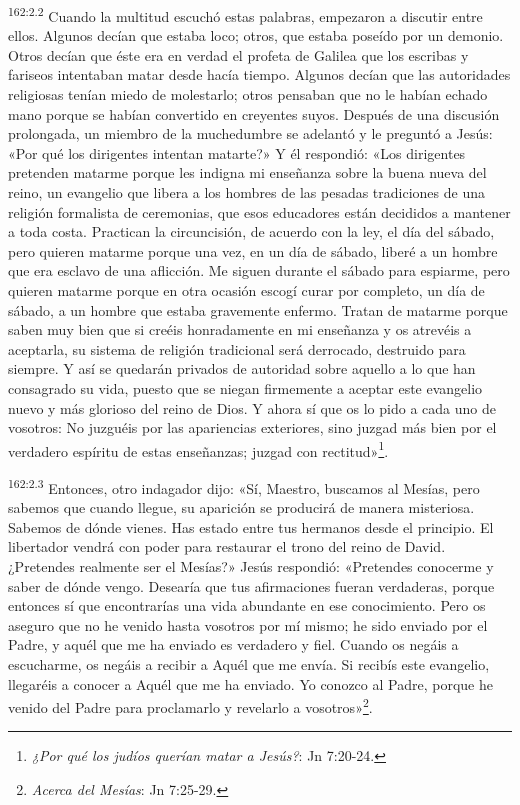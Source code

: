 \par 
\textsuperscript{162:2.2} Cuando la multitud escuchó estas palabras, empezaron a discutir entre ellos. Algunos decían que estaba loco; otros, que estaba poseído por un demonio. Otros decían que éste era en verdad el profeta de Galilea que los escribas y fariseos intentaban matar desde hacía tiempo. Algunos decían que las autoridades religiosas tenían miedo de molestarlo; otros pensaban que no le habían echado mano porque se habían convertido en creyentes suyos. Después de una discusión prolongada, un miembro de la muchedumbre se adelantó y le preguntó a Jesús: «Por qué los dirigentes intentan matarte?» Y él respondió: «Los dirigentes pretenden matarme porque les indigna mi enseñanza sobre la buena nueva del reino, un evangelio que libera a los hombres de las pesadas tradiciones de una religión formalista de ceremonias, que esos educadores están decididos a mantener a toda costa. Practican la circuncisión, de acuerdo con la ley, el día del sábado, pero quieren matarme porque una vez, en un día de sábado, liberé a un hombre que era esclavo de una aflicción. Me siguen durante el sábado para espiarme, pero quieren matarme porque en otra ocasión escogí curar por completo, un día de sábado, a un hombre que estaba gravemente enfermo. Tratan de matarme porque saben muy bien que si creéis honradamente en mi enseñanza y os atrevéis a aceptarla, su sistema de religión tradicional será derrocado, destruido para siempre. Y así se quedarán privados de autoridad sobre aquello a lo que han consagrado su vida, puesto que se niegan firmemente a aceptar este evangelio nuevo y más glorioso del reino de Dios. Y ahora sí que os lo pido a cada uno de vosotros: No juzguéis por las apariencias exteriores, sino juzgad más bien por el verdadero espíritu de estas enseñanzas; juzgad con rectitud»\footnote{\textit{¿Por qué los judíos querían matar a Jesús?}: Jn 7:20-24.}.

\par 
\textsuperscript{162:2.3} Entonces, otro indagador dijo: «Sí, Maestro, buscamos al Mesías, pero sabemos que cuando llegue, su aparición se producirá de manera misteriosa. Sabemos de dónde vienes. Has estado entre tus hermanos desde el principio. El libertador vendrá con poder para restaurar el trono del reino de David. ¿Pretendes realmente ser el Mesías?» Jesús respondió: «Pretendes conocerme y saber de dónde vengo. Desearía que tus afirmaciones fueran verdaderas, porque entonces sí que encontrarías una vida abundante en ese conocimiento. Pero os aseguro que no he venido hasta vosotros por mí mismo; he sido enviado por el Padre, y aquél que me ha enviado es verdadero y fiel. Cuando os negáis a escucharme, os negáis a recibir a Aquél que me envía. Si recibís este evangelio, llegaréis a conocer a Aquél que me ha enviado. Yo conozco al Padre, porque he venido del Padre para proclamarlo y revelarlo a vosotros»\footnote{\textit{Acerca del Mesías}: Jn 7:25-29.}.

